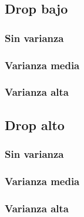 \subsection{Drop bajo}

\subsubsection{Sin varianza}

\subsubsection{Varianza media}

\subsubsection{Varianza alta}

\subsection{Drop alto}

\subsubsection{Sin varianza}

\subsubsection{Varianza media}

\subsubsection{Varianza alta}